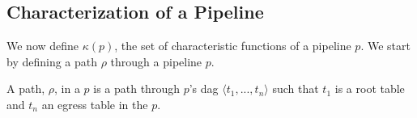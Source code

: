 






\subsection{Characterization of a Pipeline}
We now define $\kappa(p)$, the set of characteristic functions of a pipeline $p$. We start by defining a path $\rho$ through a pipeline $p$.


\begin{definition}
A path, $\rho$, in a $p$ is a path through $p$'s dag $\langle t_1, ..., t_n \rangle$ such that $t_1$ is a root table and $t_n$ an egress table in the $p$.
\end{definition}

